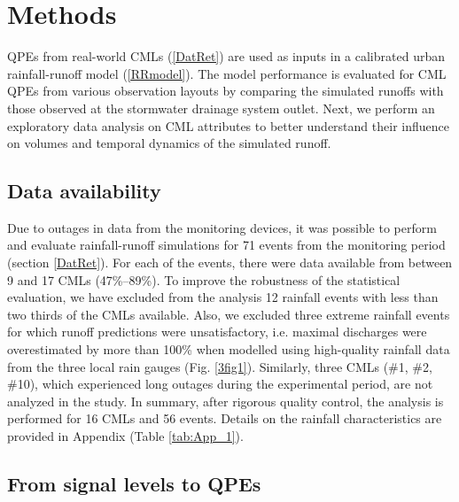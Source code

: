 \documentclass{ctuthesis}\usepackage[]{graphicx}\usepackage[]{color}
\begin{document}
 
\section{Methods} \label{paperIMnM}

QPEs from real-world CMLs (\ref{DatRet}) are used as inputs in a calibrated urban rainfall-runoff model (\ref{RRmodel}). The model performance is evaluated for CML QPEs from various observation layouts by comparing the simulated runoffs with those observed at the stormwater drainage system outlet. Next, we perform an exploratory data analysis on CML attributes to better understand their influence on volumes and temporal dynamics of the simulated runoff. 


\subsection{Data availability} \label{paperIdatAval}

Due to outages in data from the monitoring devices, it was possible to perform and evaluate rainfall-runoff simulations for 71 events from the monitoring period (section \ref{DatRet}). For each of the events, there were data available from between 9 and 17 CMLs (47\%--89\%). To improve the robustness of the statistical evaluation, we have excluded from the analysis 12 rainfall events with less than two thirds of the CMLs available. Also, we excluded three extreme rainfall events for which runoff predictions were unsatisfactory, i.e. maximal discharges were overestimated by more than 100\% when modelled using high-quality rainfall data from the three local rain gauges (Fig. \ref{3fig1}). Similarly, three CMLs (\#1, \#2, \#10), which experienced long outages during the experimental period, are not analyzed in the study. In summary, after rigorous quality control, the analysis is performed for 16 CMLs and 56 events. Details on the rainfall characteristics are provided in Appendix (Table \ref{tab:App_1}).


\subsection{From signal levels to QPEs} \label{DerCML}
\end{document}
